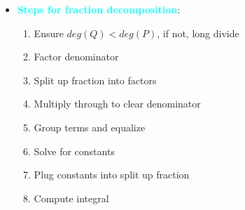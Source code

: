 \documentclass{report}
\begin{document}
\begin{itemize}
        \item \textbf{\textcolor{cyan}{Steps for fraction decomposition}}:
            \begin{enumerate}
                \item Ensure $deg(Q) < deg(P)$, if not, long divide
                \item Factor denominator
                \item Split up fraction into factors
                \item Multiply through to clear denominator
                \item Group terms and equalize
                \item Solve for constants
                \item Plug constants into split up fraction
                \item Compute integral
            \end{enumerate}


\end{itemize}
\end{document}
